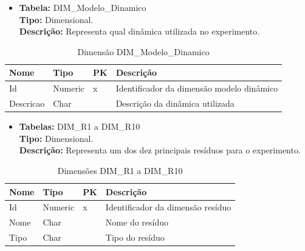 
\begin{itemize}
	\item
		\textbf{Tabela:} DIM\_Modelo\_Dinamico \\
		\textbf{Tipo:} Dimensional. \\
		\textbf{Descrição:} Representa qual dinâmica utilizada no experimento. \\
\end{itemize}
\begin{table}[!htbp]
	\caption{Dimensão DIM\_Modelo\_Dinamico}
	\centering
	\begin{tabular}{@{}llll@{}}
	\toprule
	\textbf{Nome} 	& \textbf{Tipo} & \textbf{PK} & \textbf{Descrição}           			\\ \midrule
	Id            	& Numeric           & x           & Identificador da dimensão modelo dinâmico   \\
	Descricao     	& Char       &             & Descrição da dinâmica utilizada        \\ \bottomrule
	\end{tabular}
\end{table}


\begin{itemize}
	\item
		\textbf{Tabelas:} DIM\_R1 a DIM\_R10 \\
		\textbf{Tipo:} Dimensional. \\
		\textbf{Descrição:} Representa um dos dez principais resíduos para o experimento. \\
\end{itemize}
\begin{table}[!htbp]
	\caption{Dimensões DIM\_R1 a DIM\_R10}
	\centering
	\begin{tabular}{@{}llll@{}}
	\toprule
	\textbf{Nome} 	& \textbf{Tipo} & \textbf{PK} & \textbf{Descrição}           		\\ \midrule
	Id            	& Numeric           & x           & Identificador da dimensão resíduo   \\
	Nome 		  & Char       &             & Nome do resíduo 					   	\\ 
	Tipo          & Char       &             & Tipo do resíduo           	   		\\ \bottomrule   
	\end{tabular}
\end{table}
	
